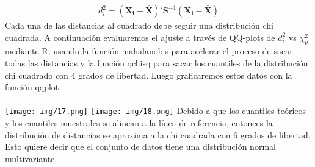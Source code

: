 \begin{sol}
\begin{itemize}
\begin{align*}
d_i^2=(\mathbf{X_i-\bar{X}})'\mathbf{S}^{-1}(\mathbf{X_i-\bar{X}})
\end{align*}
Cada una de las distancias al cuadrado debe seguir una distribución chi cuadrada. A continuación evaluaremos el ajuste a través de QQ-plots de $d_i^2$ vs $\chi_p^2$ mediante R, usando la función  mahalanobis para acelerar el proceso de sacar todas las distancias y la función qchisq para sacar los cuantiles de la distribución chi cuadrado con 4 grados de libertad. Luego graficaremos estos datos con la función qqplot. \\\\
\texttt{[image: img/17.png]}
\texttt{[image: img/18.png]}
Debido a que los cuantiles teóricos y los cuantiles muestrales se alinean a la línea de referencia, entonces la distribución de distancias se aproxima a la chi cuadrada con 6 grados de libertad. Esto quiere decir que el conjunto de datos tiene una distribución normal multivariante.\\

\end{itemize}
\end{sol}